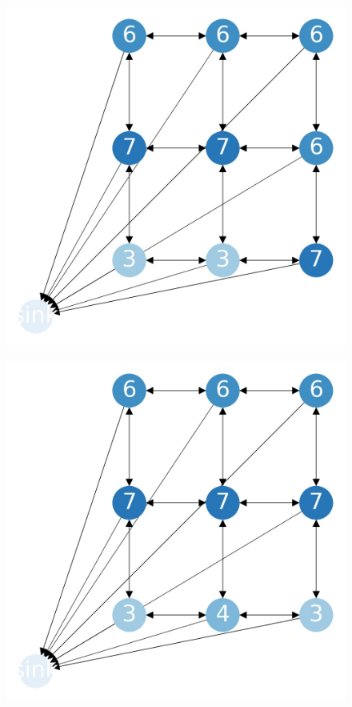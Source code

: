 \documentclass{beamer}
\begin{document}
\begin{frame}
  \begin{figure}[h!]
    \centering
      \includegraphics[scale=0.25]{sandpile_2}
  \end{figure}
\end{frame}


\begin{frame}
  \begin{figure}[h!]
    \centering
      \includegraphics[scale=0.25]{sandpile_3}
  \end{figure}
\end{frame}
\end{document}
